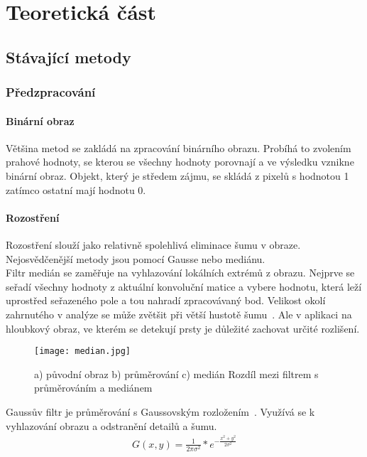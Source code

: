 \chapter{Teoretická část}

\section{Stávající metody}
\subsection{Předzpracování}
\subsubsection{Binární obraz}
Většina metod se zakládá na zpracování binárního obrazu. Probíhá to zvolením prahové hodnoty, se kterou se všechny hodnoty porovnají a ve výsledku vznikne binární obraz. Objekt, který je středem zájmu, se skládá z pixelů s hodnotou 1 zatímco ostatní mají hodnotu 0.
\subsubsection{Rozostření}
Rozostření slouží jako relativně spolehlivá eliminace šumu v obraze. Nejosvědčenější metody jsou pomocí Gausse nebo mediánu.\\

Filtr medián se zaměřuje na vyhlazování lokálních extrémů z obrazu. Nejprve se seřadí všechny hodnoty z aktuální konvoluční matice a vybere hodnotu, která leží uprostřed seřazeného pole a tou nahradí zpracovávaný bod. Velikost okolí zahrnutého v analýze se může zvětšit při větší hustotě šumu~\cite{15}. Ale v aplikaci na hloubkový obraz, ve kterém se detekují prsty je důležité zachovat určité rozlišení.\\
\begin{figure}[h]
\centering
\texttt{[image: median.jpg]}
\caption{a) původní obraz b) průměrování c) medián
Rozdíl mezi filtrem s průměrováním a mediánem 
~\cite{15} }
\end{figure}


Gaussův filtr je průměrování s Gaussovským rozložením~\cite{15}. Využívá se k vyhlazování obrazu a odstranění detailů a šumu. 
\begin{eqnarray}
G(x,y) = \frac{1}{2 \pi \sigma^{2}}*e^{-\frac{x^{2}+y^{2}}{2\sigma^{2}}}
\end{eqnarray}

